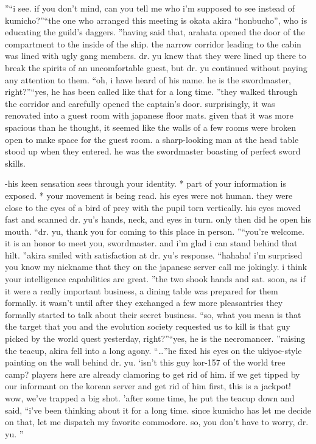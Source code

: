 ”“i see.
 if you don’t mind, can you tell me who i’m supposed to see instead of kumicho?”“the one who arranged this meeting is okata akira “honbucho”, who is educating the guild’s daggers.
”having said that, arahata opened the door of the compartment to the inside of the ship.
the narrow corridor leading to the cabin was lined with ugly gang members.
dr.
 yu knew that they were lined up there to break the spirits of an uncomfortable guest, but dr.
 yu continued without paying any attention to them.
“oh, i have heard of his name.
 he is the swordmaster, right?”“yes, he has been called like that for a long time.
”they walked through the corridor and carefully opened the captain’s door.
surprisingly, it was renovated into a guest room with japanese floor mats.
 given that it was more spacious than he thought, it seemed like the walls of a few rooms were broken open to make space for the guest room.
a sharp-looking man at the head table stood up when they entered.
he was the swordmaster boasting of perfect sword skills.


-his keen sensation sees through your identity.
* part of your information is exposed.
* your movement is being read.
his eyes were not human.
 they were close to the eyes of a bird of prey with the pupil torn vertically.
 his eyes moved fast and scanned dr.
 yu’s hands, neck, and eyes in turn.
only then did he open his mouth.
“dr.
 yu, thank you for coming to this place in person.
”“you’re welcome.
 it is an honor to meet you, swordmaster.
 and i’m glad i can stand behind that hilt.
”akira smiled with satisfaction at dr.
 yu’s response.
“hahaha! i’m surprised you know my nickname that they on the japanese server call me jokingly.
 i think your intelligence capabilities are great.
”the two shook hands and sat.
soon, as if it were a really important business, a dining table was prepared for them formally.
it wasn’t until after they exchanged a few more pleasantries they formally started to talk about their secret business.
“so, what you mean is that the target that you and the evolution society requested us to kill is that guy picked by the world quest yesterday, right?”“yes, he is the necromancer.
”raising the teacup, akira fell into a long agony.
“…”he fixed his eyes on the ukiyoe-style painting on the wall behind dr.
 yu.
‘isn’t this guy kor-157 of the world tree camp? players here are already clamoring to get rid of him.
 if we get tipped by our informant on the korean server and get rid of him first, this is a jackpot! wow, we’ve trapped a big shot.
’after some time, he put the teacup down and said, “i’ve been thinking about it for a long time.
 since kumicho has let me decide on that, let me dispatch my favorite commodore.
 so, you don’t have to worry, dr.
 yu.
”

 